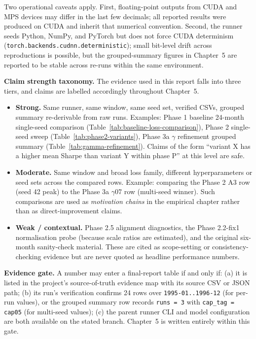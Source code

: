 Two operational caveats apply. First, floating-point outputs from CUDA and MPS devices may differ in the last few decimals; all reported results were produced on CUDA and inherit that numerical convention. Second, the runner seeds Python, NumPy, and PyTorch but does not force CUDA determinism (\texttt{torch.backends.cudnn.deterministic}); small bit-level drift across reproductions is possible, but the grouped-summary figures in Chapter~5 are reported to be stable across re-runs within the same environment.

\textbf{Claim strength taxonomy.} The evidence used in this report falls into three tiers, and claims are labelled accordingly throughout Chapter~5.

\begin{itemize}
 \item \textbf{Strong.} Same runner, same window, same seed set, verified CSVs, grouped summary re-derivable from raw runs. Examples: Phase 1 baseline 24-month single-seed comparison (Table~\ref{tab:baseline-loss-comparison}), Phase 2 single-seed sweep (Table~\ref{tab:phase2-variants}), Phase 3a $\gamma$ refinement grouped summary (Table~\ref{tab:gamma-refinement}). Claims of the form ``variant X has a higher mean Sharpe than variant Y within phase P'' at this level are safe.
 \item \textbf{Moderate.} Same window and broad loss family, different hyperparameters or seed sets across the compared rows. Example: comparing the Phase 2 A3 row (seed 42 peak) to the Phase 3a $\gamma$07 row (multi-seed winner). Such comparisons are used as \emph{motivation chains} in the empirical chapter rather than as direct-improvement claims.
 \item \textbf{Weak / contextual.} Phase 2.5 alignment diagnostics, the Phase 2.2-fix1 normalisation probe (because scale ratios are estimated), and the original six-month sanity-check material. These are cited as scope-setting or consistency-checking evidence but are never quoted as headline performance numbers.
\end{itemize}

\textbf{Evidence gate.} A number may enter a final-report table if and only if: (a) it is listed in the project's source-of-truth evidence map with its source CSV or JSON path; (b) its run's verification confirms 24 rows over \texttt{1995-01..1996-12} (for per-run values), or the grouped summary row records \texttt{runs = 3} with \texttt{cap\_tag = cap05} (for multi-seed values); (c) the parent runner CLI and model configuration are both available on the stated branch. Chapter~5 is written entirely within this gate.
